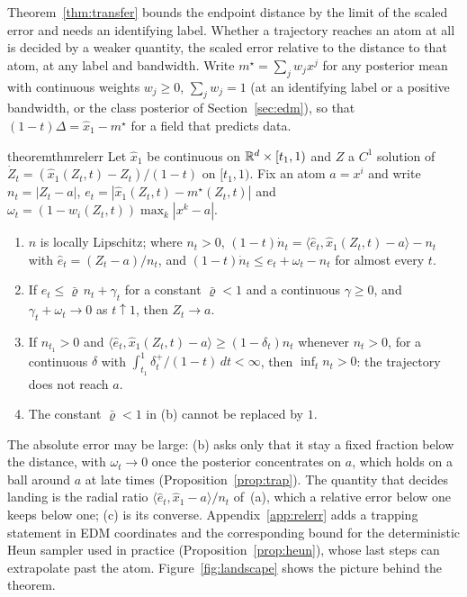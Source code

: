 \documentclass{article} %
\theoremstyle{plain}
\theoremstyle{definition}
\theoremstyle{remark}
\begin{document}
Theorem~\ref{thm:transfer} bounds the endpoint distance by the limit of the scaled error and needs
an identifying label. Whether a trajectory reaches an atom at all is decided by a weaker quantity,
the scaled error relative to the distance to that atom, at any label and bandwidth. Write
$m^\star=\sum_jw_jx^j$ for any posterior mean with continuous weights $w_j\ge0$, $\sum_jw_j=1$
(at an identifying label or a positive bandwidth, or the class posterior of
Section~\ref{sec:edm}), so that $(1-t)\Delta=\hat x_1-m^\star$ for a field that predicts data.

\begin{restatable}{theorem}{thmrelerr}
\label{thm:relerr}
Let $\hat x_1$ be continuous on $\mathbb{R}^d\times[t_1,1)$ and $Z$ a $C^1$ solution of
$\dot Z_t=(\hat x_1(Z_t,t)-Z_t)/(1-t)$ on $[t_1,1)$. Fix an atom $a=x^i$ and write
$n_t=|Z_t-a|$, $e_t=|\hat x_1(Z_t,t)-m^\star(Z_t,t)|$ and
$\omega_t=(1-w_i(Z_t,t))\max_k|x^k-a|$.
\begin{enumerate}[label=(\alph*),leftmargin=2em]
\item $n$ is locally Lipschitz; where $n_t>0$,
  $(1-t)\dot n_t=\langle\hat e_t,\hat x_1(Z_t,t)-a\rangle-n_t$ with $\hat e_t=(Z_t-a)/n_t$, and
  $(1-t)\dot n_t\le e_t+\omega_t-n_t$ for almost every $t$.
\item If $e_t\le\bar\varrho\,n_t+\gamma_t$ for a constant $\bar\varrho<1$ and a continuous
  $\gamma\ge0$, and $\gamma_t+\omega_t\to0$ as $t\uparrow1$, then $Z_t\to a$.
\item If $n_{t_1}>0$ and $\langle\hat e_t,\hat x_1(Z_t,t)-a\rangle\ge(1-\delta_t)n_t$ whenever
  $n_t>0$, for a continuous $\delta$ with $\int_{t_1}^1\delta_t^+/(1-t)\,dt<\infty$, then
  $\inf_tn_t>0$: the trajectory does not reach $a$.
\item The constant $\bar\varrho<1$ in (b) cannot be replaced by $1$.
\end{enumerate}
\end{restatable}

The absolute error may be large: (b) asks only that it stay a fixed fraction below the distance,
with $\omega_t\to0$ once the posterior concentrates on $a$, which holds on a ball around $a$ at
late times (Proposition~\ref{prop:trap}). The quantity that decides landing is the radial ratio
$\langle\hat e_t,\hat x_1-a\rangle/n_t$ of~(a), which a relative error below one keeps below one;
(c) is its converse. Appendix~\ref{app:relerr} adds a trapping statement in EDM coordinates and
the corresponding bound for the deterministic Heun sampler used in practice
(Proposition~\ref{prop:heun}), whose last steps can extrapolate past the atom.
Figure~\ref{fig:landscape} shows the picture behind the theorem.
\end{document}
